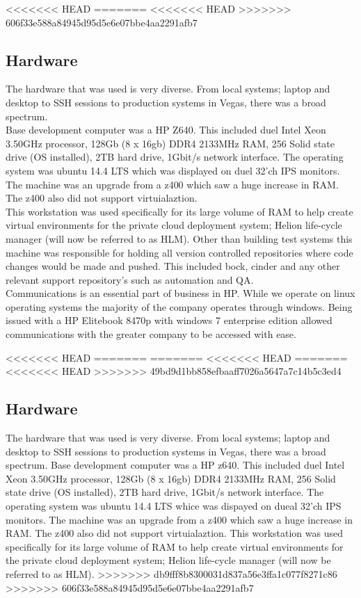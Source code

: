 \documentclass[11pt,a4paper]{report}
\begin{document}
<<<<<<< HEAD
=======
<<<<<<< HEAD
>>>>>>> 606f33e588a84945d95d5e6e07bbe4aa2291afb7
\subsection{Hardware}
The hardware that was used is very diverse. From local systems; laptop and desktop to SSH sessions to production systems in Vegas, there was a broad spectrum.\\

Base development computer was a HP Z640. This included duel Intel Xeon 3.50GHz processor, 128Gb (8 x 16gb) DDR4 2133MHz RAM, 256 Solid state drive (OS installed), 2TB hard drive, 1Gbit/s network interface. The operating system was ubuntu 14.4 LTS which was displayed on duel 32'ch IPS monitors. The machine was an upgrade from a z400 which saw a huge increase in RAM. The z400 also did not support virtuialaztion.\\ This workstation was used specifically for its large volume of RAM to help create virtual environments for the private cloud deployment system; Helion life-cycle manager (will now be referred to as HLM). Other than building test systems this machine was responsible for holding all version controlled repositories where code changes would be made and pushed. This included bock, cinder and any other relevant support repository’s such as automation and QA. \\

Communications is an essential part of business in HP. While we operate on linux operating systems the majority of the company operates through windows. Being issued with a HP Elitebook 8470p with windows 7 enterprise edition allowed communications with the greater company to be accessed with ease. 

<<<<<<< HEAD
=======
=======
<<<<<<< HEAD
=======
<<<<<<< HEAD
>>>>>>> 49bd9d1bb858efbaaff7026a5647a7c14b5c3ed4
\subsection{Hardware}
The hardware that was used is very diverse. From local systems; laptop and desktop to SSH sessions to production systems in Vegas, there was a broad spectrum.
Base development computer was a HP z640. This included duel Intel Xeon 3.50GHz processor, 128Gb (8 x 16gb) DDR4 2133MHz RAM, 256 Solid state drive (OS installed), 2TB hard drive, 1Gbit/s network interface. The operating system was ubuntu 14.4 LTS whice was dispayed on dueal 32'ch IPS monitors. The machine was an upgrade from a z400 which saw a huge increase in RAM. The z400 also did not support virtuialaztion. This workstation was used specifically for its large volume of RAM to help create virtual environments for the private cloud deployment system; Helion life-cycle manager (will now be referred to as HLM).
>>>>>>> db9fff8b8300031d837a56e3ffa1c077f8271c86
>>>>>>> 606f33e588a84945d95d5e6e07bbe4aa2291afb7
\end{document}
